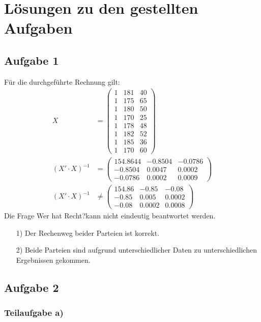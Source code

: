 \documentclass{llncs}
\begin{document}
\chapter*{L\"osungen zu den gestellten Aufgaben}

\section*{Aufgabe 1}

F\"ur die durchgef\"uhrte Rechnung gilt:
\begin{align*}
                X &= \left( \begin{matrix} 1 & 181 & 40\\1 & 175 & 65\\1 & 180 & 50\\1 & 170 & 25\\1 & 178 & 48 \\ 1 & 182 & 52\\1 & 185 & 36\\ 1 & 170 & 60\end{matrix} \right) \\
(X' \cdot X)^{-1} &= \left( \begin{matrix} 154.8644 & -0.8504 & -0.0786 \\ -0.8504 & 0.0047 & 0.0002 \\ -0.0786 & 0.0002 & 0.0009 \end{matrix} \right) \\
(X' \cdot X)^{-1} &\neq \left( \begin{matrix}154.86 & -0.85 & -0.08\\-0.85 & 0.005 & 0.0002\\-0.08 & 0.0002 & 0.0008\end{matrix} \right)
\end{align*}
Die Frage \glqq Wer hat Recht?\grqq kann nicht eindeutig beantwortet werden.
\begin{itemize}
\item[1)] Der Rechenweg beider Parteien ist korrekt.
\item[2)] Beide Parteien sind aufgrund unterschiedlicher Daten zu unterschiedlichen Ergebnissen gekommen.
\end{itemize}

\newpage

\section*{Aufgabe 2}

\subsection*{Teilaufgabe a)}
\end{document}
